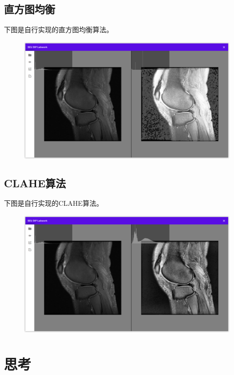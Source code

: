 \documentclass{article}
\begin{document}
\subsection{直方图均衡}

下图是自行实现的直方图均衡算法。

\begin{figure}[H]
    \includegraphics[width=\textwidth]{img/histo_equ.png}
\end{figure}

\subsection{CLAHE算法}

下图是自行实现的CLAHE算法。

\begin{figure}[H]
    \includegraphics[width=\textwidth]{img/clahe.png}
\end{figure}

\section{思考}
\end{document}
